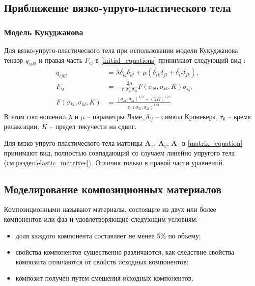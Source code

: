 \subsection{Приближение вязко-упруго-пластического тела}

\subsubsection{Модель Кукуджанова}
\label{kukudzhanov_matrixes}

Для вязко-упруго-пластического тела при использовании модели Кукуджанова тензор $q_{ijkl}$ и правая часть $F_{ij}$ в \ref{initial_equations} принимают следующий вид \cite{kukudzhanov, p21, p27}:
\begin{align}
\label{tensor_qijkl_kukudzhanov}
q_{ijkl}&=\lambda\delta_{ij}\delta_{kl}+\mu(\delta_{ik}\delta_{jl}+\delta_{il}
\delta_{jk}),\nonumber\\
F_{ij}&=-\frac{2\mu}{\tau_0\sigma_{kl}\sigma_{kl}} F(\sigma_{kl},\sigma_{kl},K)\sigma_{ij},\nonumber\\
F(\sigma_{kl},\sigma_{kl},K) &= \frac{(\sigma_{kl},\sigma_{kl})^{1/2}-(2K)^{1/2}}{\tau_0(\sigma_{kl},\sigma_{kl})^{1/2}}
\end{align}
В этом соотношении $\lambda$ и $\mu$ -- параметры Ламе, $\delta_{ij}$ -- символ Кронекера, $\tau_0$ -- время релаксации, $K$ -- предел текучести на сдвиг.

Для вязко-упруго-пластического тела матрицы $\mathbf{A}_x$, $\mathbf{A}_y$, $\mathbf{A}_z$ в \ref{matrix_equation} принимают вид, полностью совпадающий со случаем линейно упругого тела (см.раздел\ref{elastic_matrixes}). Отличия только в правой части уравнений.


\clearpage
\newpage

\subsection{Моделирование композиционных материалов}

Композиционными называют материалы, состоящие из двух или более компонентов или фаз и удовлетворяющие следующим условиям:
\begin{itemize}
\item доля каждого компонента составляет не менее 5\% по объему;
\item свойства компонентов существенно различаются, как следствие свойства композита отличаются от свойств исходных компонентов;
\item композит получен путем смешения исходных компонентов.
\end{itemize}

